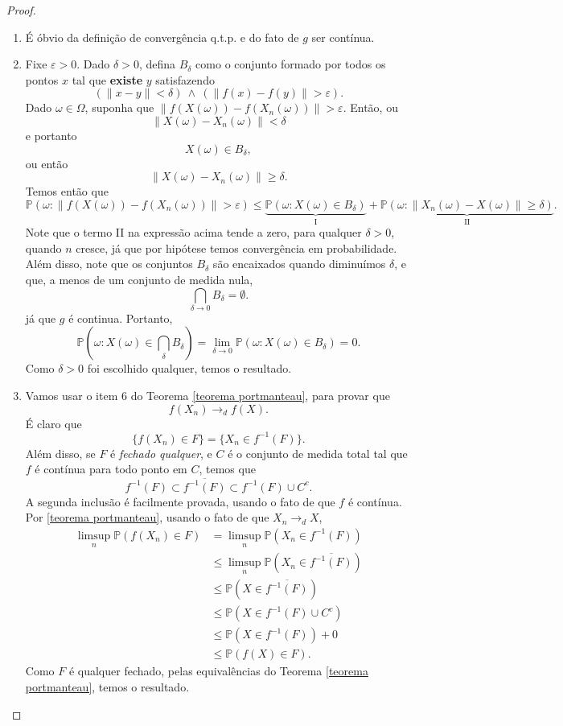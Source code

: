 \documentclass[12pt,a4paper,oneside]{book}
\theoremstyle{definition}
\theoremstyle{remark}
\numberwithin{equation}{section}
\newcommand{\e}{\varepsilon}
\newcommand{\pr}{\mathbb{P}}
\begin{document}
\begin{proof}
$ $
\begin{enumerate}
\item É óbvio da definição de convergência q.t.p. e do fato de $g$ ser contínua.
\item Fixe $\e>0$. Dado $\delta>0$, defina $B_\delta$ como o conjunto formado por todos os pontos $x$ tal que \textbf{existe} $y$ satisfazendo
$$(\|x-y\|< \delta ) \ \wedge \  ( \|f(x)-f(y)  \| > \e ). $$
Dado $\omega\in \Omega$, suponha que $\|f(X(\omega))-f(X_n(\omega))\|> \e.$ Então, ou 
$$\|X(\omega)-X_n(\omega)\|< \delta$$
 e portanto
$$X(\omega)\in B_\delta,$$
ou então 
$$\|X(\omega)-X_n(\omega)\|\geq  \delta.$$
Temos então que
$$\pr(\omega:\|f(X(\omega))-f(X_n(\omega))\|>\e)\leq \underbrace{\pr(\omega:X(\omega)\in B_\delta)}_{\textrm{I}} + \underbrace{\pr(\omega:\|X_n(\omega)-X(\omega)\|\geq \delta)}_{\textrm{II}}. $$
Note que o termo II na expressão acima tende a zero, para qualquer $\delta>0$, quando $n$ cresce, já que por hipótese temos convergência em probabilidade.
Além disso, note que os conjuntos $B_\delta$ são encaixados quando diminuímos $\delta$, e que, a menos de um conjunto de medida nula,
$$ \bigcap_{\delta \rightarrow 0} B_\delta  = \emptyset.$$
já que $g$ é continua. Portanto,
$$\pr(\omega:X(\omega)\in \bigcap_\delta B_\delta) = \lim_{\delta \rightarrow 0}\pr(\omega:X(\omega)\in B_\delta) = 0. $$
Como $\delta>0$ foi escolhido qualquer, temos o resultado.

\item  Vamos usar o item 6 do Teorema \ref{teorema portmanteau}, para provar que
$$f(X_n)\rightarrow_d f(X). $$
É claro que 
$$\{ f(X_n)\in F \} = \{X_n \in f^{-1}(F) \}. $$
Além disso, se $F$ é \emph{fechado qualquer}, e $C$ é o conjunto de medida total tal que $f$ é contínua para todo ponto em $C$, temos que
$$f^{-1}(F)\subset \overline{f^{-1}(F)}\subset f^{-1}(F)\cup C^c. $$
A segunda inclusão é facilmente provada, usando o fato de que $f$ é contínua. Por \ref{teorema portmanteau}, usando o fato de que $X_n \rightarrow_d X$,
\begin{align*}
\limsup_n \pr(f(X_n)\in F) & = \limsup_n \pr(X_n\in f^{-1}(F))\\
&\leq \limsup_n \pr(X_n\in \overline{f^{-1}(F)})\\
&\leq \pr(X\in \overline{f^{-1}(F)})\\
&\leq  \pr(X\in f^{-1}(F)\cup C^c)\\
&\leq  \pr(X\in f^{-1}(F))+0\\
&\leq  \pr(f(X)\in F).
\end{align*}
Como $F$ é qualquer fechado, pelas equivalências do Teorema \ref{teorema portmanteau}, temos o resultado.

\end{enumerate}
\end{proof}
\end{document}
